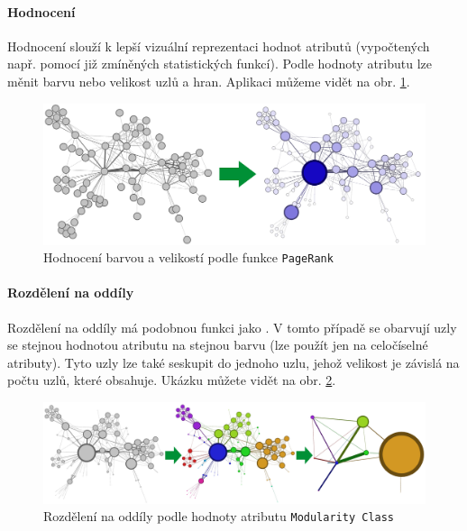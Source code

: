 \documentclass[thesis=M,czech]{FITthesis}[2014/05/6]
\begin{document}
\paragraph{Hodnocení}
Hodnocení slouží k lepší vizuální reprezentaci hodnot atributů (vypočtených např. pomocí již zmíněných statistických funkcí). Podle hodnoty atributu lze 
měnit barvu nebo velikost uzlů a hran. Aplikaci  můžeme vidět na obr. \ref{fig:gephi-ranking}.

\begin{figure}\centering
 	\includegraphics[width=1\textwidth]{images/gephi/ranking_before-after}
 	\caption[Hodnocení barvou a velikostí podle funkce \texttt{PageRank}]{Hodnocení barvou a velikostí podle funkce \texttt{PageRank}}\label{fig:gephi-ranking}
\end{figure}

\paragraph{Rozdělení na oddíly}
Rozdělení na oddíly má podobnou funkci jako . V tomto případě se obarvují uzly se stejnou hodnotou atributu na stejnou barvu (lze použít jen na celočíselné
atributy). Tyto uzly lze také seskupit do jednoho uzlu, jehož velikost je závislá na počtu uzlů, které obsahuje. Ukázku můžete vidět na obr. \ref{fig:gephi-grouping}.

\begin{figure}\centering
 	\includegraphics[width=1\textwidth]{images/gephi/grouping_before-after}
 	\caption[Rozdělení na oddíly podle hodnoty atributu \texttt{Modularity Class}]{Rozdělení na oddíly podle hodnoty atributu \texttt{Modularity Class}}\label{fig:gephi-grouping}
\end{figure}
\end{document}
